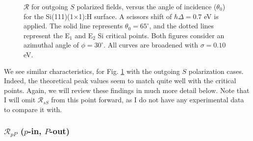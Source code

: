 \begin{figure}[H]
\centering
{}\hfill
{}
\caption{$\mathcal{R}$ for outgoing $S$ polarized fields, versus the angle of
incidence ($\theta_{0}$) for the Si(111)(1$\times$1):H surface. A scissors shift
of $\hbar\Delta = 0.7$ eV is applied. The solid line represents $\theta_{0} =
65^{\circ}$, and the dotted lines represent the E$_{1}$ and E$_{2}$ Si critical
points. Both figures consider an azimuthal angle of $\phi = 30^{\circ}$. All
curves are broadened with $\sigma = 0.10$ eV.}
\label{fig:1x1rS3d}
\end{figure}

We see similar characteristics, for Fig. \ref{fig:1x1rS3d} with the outgoing $S$
polarization cases. Indeed, the theoretical peak values seem to match quite well
with the critical points. Again, we will review these findings in much more
detail below. Note that I will omit $\mathcal{R}_{sS}$ from this point forward,
as I do not have any experimental data to compare it with.



\subsubsection{\texorpdfstring{$\mathcal{R}_{pP}$}{RpP} ($p$-in, $P$-out)}
\label{sec:1x1RpP}



